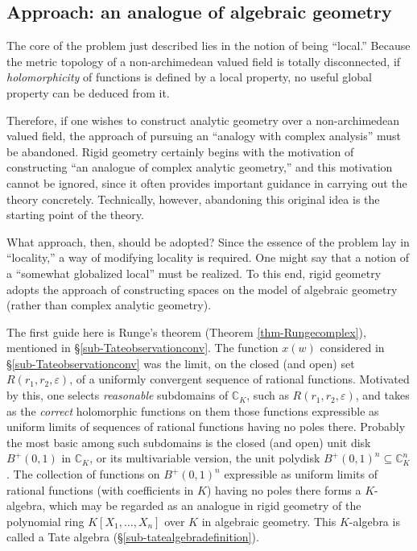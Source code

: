 \documentclass[a4paper,12pt, dvipdfmx]{jsbook}
\def\C{\mathbb{C}}
\theoremstyle{plain}
\theoremstyle{definition}
\begin{document}
\subsection{Approach: an analogue of algebraic geometry}\label{approachalgebraicgeometry}
The core of the problem just described lies in the notion of being ``local.''
Because the metric topology of a non-archimedean valued field is totally disconnected, if {\it holomorphicity} of functions is defined by a local property, no useful global property can be deduced from it.

Therefore, if one wishes to construct analytic geometry over a non-archimedean valued field, the approach of pursuing an ``analogy with complex analysis'' must be abandoned.
Rigid geometry certainly begins with the motivation of constructing ``an analogue of complex analytic geometry,'' and this motivation cannot be ignored, since it often provides important guidance in carrying out the theory concretely. Technically, however, abandoning this original idea is the starting point of the theory.

What approach, then, should be adopted?
Since the essence of the problem lay in ``locality,'' a way of modifying locality is required.
One might say that a notion of a ``somewhat globalized local'' must be realized. To this end, rigid geometry adopts the approach of constructing spaces on the model of algebraic geometry (rather than complex analytic geometry).

The first guide here is Runge's theorem (Theorem \ref{thm-Rungecomplex}), mentioned in \S\ref{sub-Tateobservationconv}.
The function $x(w)$ considered in \S\ref{sub-Tateobservationconv} was the limit, on the closed (and open) set $R(r_1,r_2,\varepsilon)$, of a uniformly convergent sequence of rational functions.
Motivated by this, one selects {\it reasonable} subdomains of $\C_K$, such as $R(r_1,r_2,\varepsilon)$, and takes as the {\it correct} holomorphic functions on them those functions expressible as uniform limits of sequences of rational functions having no poles there.
Probably the most basic among such subdomains is the closed (and open) unit disk $B^+(0,1)$ in $\C_K$, or its multivariable version, the unit polydisk $B^+(0,1)^n\subseteq\C^n_K$.
The collection of functions on $B^+(0,1)^n$ expressible as uniform limits of rational functions (with coefficients in $K$) having no poles there forms a $K$-algebra, which may be regarded as an analogue in rigid geometry of the polynomial ring $K[X_1,\ldots,X_n]$ over $K$ in algebraic geometry.
This $K$-algebra is called a Tate algebra (\S\ref{sub-tatealgebradefinition}).
\end{document}
